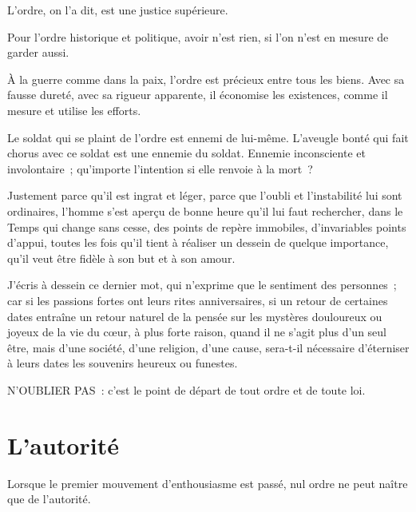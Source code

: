 \documentclass[french,twoside]{book} %
\newcommand{\astermono}{\medskip\centerline{\color{rubric}\large\selectfont{\syms ✻}}\medskip\par}%
\begin{document}
\noindent L’ordre, on l’a dit, est une justice supérieure.\par

\astermono

\noindent Pour l’ordre historique et politique, avoir n’est rien, si l’on n’est en mesure de garder aussi.\par

\astermono

\noindent À la guerre comme dans la paix, l’ordre est précieux entre tous les biens. Avec sa fausse dureté, avec sa rigueur apparente, il économise les existences, comme il mesure et utilise les efforts.\par
Le soldat qui se plaint de l’ordre est ennemi de lui-même. L’aveugle bonté qui fait chorus avec ce soldat est une ennemie du soldat. Ennemie inconsciente et involontaire ; qu’importe l’intention si elle renvoie à la mort ?\par
Justement parce qu’il est ingrat et léger, parce que l’oubli et l’instabilité lui sont ordinaires, l’homme s’est aperçu de bonne heure qu’il lui faut rechercher, dans le Temps qui change sans cesse, des points de repère immobiles, d’invariables points d’appui, toutes les fois qu’il tient à réaliser un dessein de quelque importance, qu’il veut être fidèle à son but et à son amour.\par
J’écris à dessein ce dernier mot, qui n’exprime que le sentiment des personnes ; car si les passions fortes ont leurs rites anniversaires, si un retour de certaines dates entraîne un retour naturel de la pensée sur les mystères douloureux ou joyeux de la vie du cœur, à plus forte raison, quand il ne s’agit plus d’un seul être, mais d’une société, d’une religion, d’une cause, sera-t-il nécessaire d’éterniser à leurs dates les souvenirs heureux ou funestes.\par
N’OUBLIER PAS : c’est le point de départ de tout ordre et de toute loi.
\section[L’autorité]{L’autorité}
\noindent Lorsque le premier mouvement d’enthousiasme est passé, nul ordre ne peut naître que de l’autorité.\par
\end{document}
